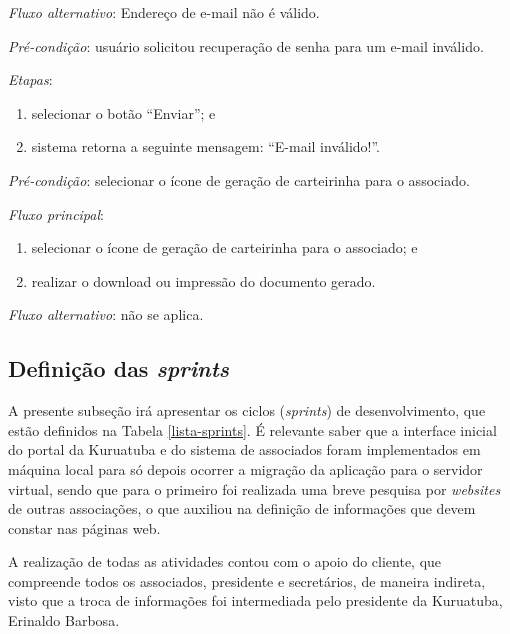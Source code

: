 \noindent \textit{Fluxo alternativo}: Endereço de e-mail não é válido.

\noindent \textit{Pré-condição}: usuário solicitou recuperação de senha para um e-mail inválido.

\noindent \textit{Etapas}:

\begin{enumerate}
    \item selecionar o botão ``Enviar''; e
    \item sistema retorna a seguinte mensagem: ``E-mail inválido!''.
\end{enumerate}



\vspace{0.7cm}

\noindent \textit{Pré-condição}: selecionar o ícone de geração de carteirinha para o associado.

\noindent \textit{Fluxo principal}:

\begin{enumerate}
    \item selecionar o ícone de geração de carteirinha para o associado; e
    \item realizar o download ou impressão do documento gerado.
\end{enumerate}

\noindent \textit{Fluxo alternativo}: não se aplica.



\hspace{2.5cm}
\subsection{Definição das \textit{sprints}}
\label{subsec:sprints}
\hspace{2.5cm}

A presente subseção irá apresentar os ciclos (\textit{sprints}) de desenvolvimento, que estão definidos na Tabela \ref{lista-sprints}. É relevante saber que a interface inicial do portal da Kuruatuba e do sistema de associados foram implementados em máquina local para só depois ocorrer a migração da aplicação para o servidor virtual, sendo que para o primeiro foi realizada uma breve pesquisa por \textit{websites} de outras associações, o que auxiliou na definição de informações que devem constar nas páginas web. 

A realização de todas as atividades contou com o apoio do cliente, que compreende todos os associados, presidente e secretários, de maneira indireta, visto que a troca de informações foi intermediada pelo presidente da Kuruatuba, Erinaldo Barbosa.


